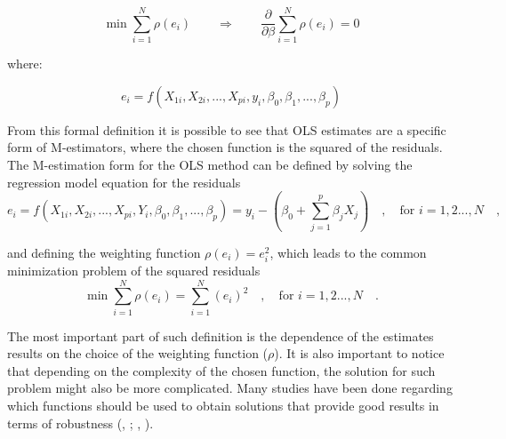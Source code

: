 \documentclass[a4paper]{article}
\begin{document}
\begin{equation*}
\min \sum_{i=1}^{N}\rho(e_i) \qquad \Rightarrow \qquad \frac{\partial}{\partial\beta}\sum_{i=1}^{N}\rho(e_i)=0
\end{equation*}

\noindent
where:

\begin{equation*}
e_i=f(X_{1i},X_{2i},...,X_{pi},y_i,\beta_0,\beta_1,...,\beta_p)
\end{equation*}

\vspace{3mm}
\noindent
From this formal definition it is possible to see that OLS estimates are a specific form of M-estimators, where the chosen function is the squared of the residuals. The M-estimation form for the OLS method can be defined by solving the regression model equation for the residuals
\begin{equation*}
e_i=f(X_{1i},X_{2i},...,X_{pi},Y_i,\beta_0,\beta_1,...,\beta_p)=y_i-(\beta_{0}+\sum_{j=1}^p\beta_{j}X_{j}) \quad , \quad \text{for } i=1,2...,N \quad ,
\end{equation*}

\noindent
and defining the weighting function $\rho(e_i)=e_i^2$, which leads to the common minimization problem of the squared residuals
\begin{equation*}
\min \sum_{i=1}^{N}\rho(e_i)=\sum_{i=1}^{N}(e_i)^2 \quad , \quad \text{for } i=1,2...,N \quad.
\end{equation*}

\vspace{2mm}
\noindent
The most important part of such definition is the dependence of the estimates results on the choice of the weighting function ($\rho$). It is also important to notice that depending on the complexity of the chosen function, the solution for such problem might also be more complicated. Many studies have been done regarding which functions should be used to obtain solutions that provide good results in terms of robustness (\citeauthor{wilcox2016}, \citeyear{wilcox2016}; \citeauthor{huber1981}, \citeyear{huber1981}). 
\end{document}
